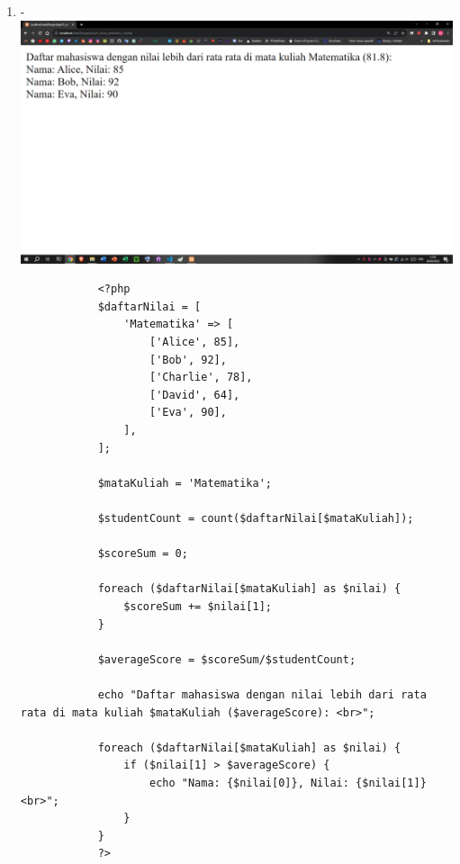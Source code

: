 \documentclass[12pt,titlepage]{article}
\begin{document}
\begin{enumerate}[label*=\arabic*.]
\begin{enumerate}[label*=\arabic*.]
        \item - \\ \includegraphics[width=.8\textwidth]{images/figures/fig19.png}
        \begin{verbatim}
            <?php
            $daftarNilai = [
                'Matematika' => [
                    ['Alice', 85],
                    ['Bob', 92],
                    ['Charlie', 78],
                    ['David', 64],
                    ['Eva', 90],
                ],
            ];

            $mataKuliah = 'Matematika';

            $studentCount = count($daftarNilai[$mataKuliah]);

            $scoreSum = 0;

            foreach ($daftarNilai[$mataKuliah] as $nilai) {
                $scoreSum += $nilai[1];
            }

            $averageScore = $scoreSum/$studentCount;

            echo "Daftar mahasiswa dengan nilai lebih dari rata rata di mata kuliah $mataKuliah ($averageScore): <br>";

            foreach ($daftarNilai[$mataKuliah] as $nilai) {
                if ($nilai[1] > $averageScore) {
                    echo "Nama: {$nilai[0]}, Nilai: {$nilai[1]} <br>";
                }
            }
            ?>
        \end{verbatim}
    \end{enumerate}
\end{enumerate}
\end{document}
